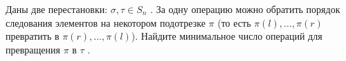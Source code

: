 \documentclass[a4paper, 12pt]{article}
\begin{document}
Даны две перестановки: $\sigma, \tau\in S_n$ . За одну операцию можно обратить порядок следования элементов
на некотором подотрезке $\pi$ (то есть $\pi(l), \dots , \pi(r)$ превратить в $\pi(r), \dots , \pi(l)$). Найдите минимальное
число операций для превращения $\pi$ в $\tau$ .
\end{document}
